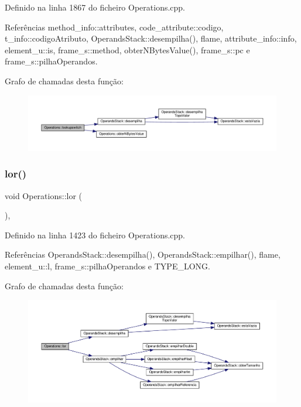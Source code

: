 Definido na linha 1867 do ficheiro Operations.\+cpp.



Referências method\+\_\+info\+::attributes, code\+\_\+attribute\+::codigo, t\+\_\+info\+::codigo\+Atributo, Operands\+Stack\+::desempilha(), flame, attribute\+\_\+info\+::info, element\+\_\+u\+::is, frame\+\_\+s\+::method, obter\+N\+Bytes\+Value(), frame\+\_\+s\+::pc e frame\+\_\+s\+::pilha\+Operandos.

Grafo de chamadas desta função\+:
\nopagebreak
\begin{figure}[H]
\begin{center}
\leavevmode
\includegraphics[width=350pt]{classOperations_a0458ee466daff63a3698973c89cfe71a_cgraph}
\end{center}
\end{figure}
\mbox{\label{classOperations_a89193dfaaa2c4c45f320c6b9f0b5601c}} 
\subsubsection{\texorpdfstring{lor()}{lor()}}
{\footnotesize\ttfamily void Operations\+::lor (\begin{DoxyParamCaption}{ }\end{DoxyParamCaption})\hspace{0.3cm}{\ttfamily [static]}, {\ttfamily [private]}}



Definido na linha 1423 do ficheiro Operations.\+cpp.



Referências Operands\+Stack\+::desempilha(), Operands\+Stack\+::empilhar(), flame, element\+\_\+u\+::l, frame\+\_\+s\+::pilha\+Operandos e T\+Y\+P\+E\+\_\+\+L\+O\+NG.

Grafo de chamadas desta função\+:
\nopagebreak
\begin{figure}[H]
\begin{center}
\leavevmode
\includegraphics[width=350pt]{classOperations_a89193dfaaa2c4c45f320c6b9f0b5601c_cgraph}
\end{center}
\end{figure}
\mbox{\label{classOperations_a437e4b34f2f1be8982d36f0cdf47f98c}} 
